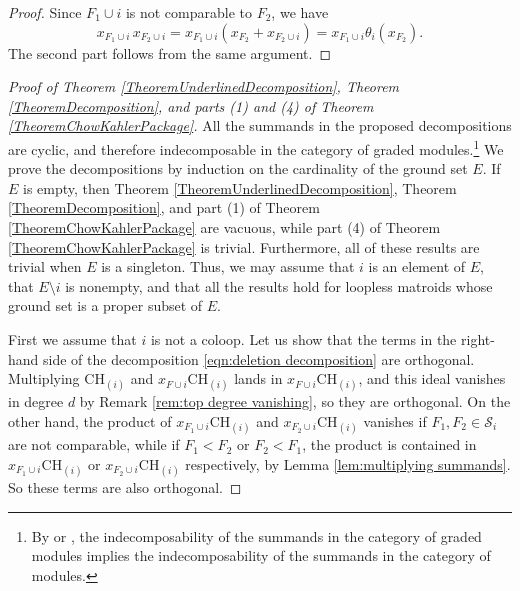 \documentclass[11pt,reqno]{amsart}
\theoremstyle{definition}
\newtheorem{lemma}[theorem]{Lemma}
\theoremstyle{remark}
\renewcommand{\(}{\left(}
\renewcommand{\)}{\right)}
\newcommand{\<}{\left<}
\renewcommand{\>}{\right>}
\begin{document}
\begin{proof}
Since $F_1\cup i$ is not comparable to $F_2$, we have
\[x_{F_1\cup i}\,x_{F_2\cup i} = x_{F_1\cup i}(x_{F_2}+x_{F_2\cup i}) = x_{F_1\cup i}\theta_i(x_{F_2}).\]
The second part follows from the same argument. 
\end{proof}




\begin{proof}[Proof of Theorem \ref{TheoremUnderlinedDecomposition}, Theorem \ref{TheoremDecomposition}, and 
parts (1) and (4) of Theorem \ref{TheoremChowKahlerPackage}]
All the summands in the proposed decompositions are cyclic, and therefore indecomposable in the category of graded  modules.\footnote{By \cite[Corollary 2]{CF} or \cite[Theorem 3.2]{GG},
the indecomposability of the summands in the category of graded modules implies the indecomposability of the summands in the category of  modules.}
We prove the decompositions by induction on the cardinality of the ground set $E$.
If $E$ is empty, then Theorem \ref{TheoremUnderlinedDecomposition}, Theorem \ref{TheoremDecomposition}, and part (1) of 
Theorem \ref{TheoremChowKahlerPackage}
are vacuous, while part (4) of Theorem \ref{TheoremChowKahlerPackage} is trivial.  Furthermore, all of these results are trivial when $E$
is a singleton.  Thus, we may assume
that $i$ is an element of $E$, that $E\setminus i$ is nonempty,
and that all the results hold for loopless matroids whose ground set is a proper subset of $E$.


First we assume that $i$ is not a coloop.  Let us show that the terms in the right-hand side of the decomposition \eqref{eqn:deletion decomposition} are orthogonal.  Multiplying $\mathrm{CH}_{(i)}$ and $x_{F\cup i}\mathrm{CH}_{(i)}$ lands in $x_{F\cup i}\mathrm{CH}_{(i)}$, and this ideal
vanishes in degree $d$ by Remark \ref{rem:top degree vanishing}, so they are orthogonal.  On the other hand, the product of $x_{F_1\cup i}\mathrm{CH}_{(i)}$ and 
$x_{F_2\cup i}\mathrm{CH}_{(i)}$ vanishes if $F_1, F_2\in \mathscr{S}_i$ are not comparable, while if $F_1 < F_2$ or $F_2 < F_1$, the product is contained in $x_{F_1\cup i}\mathrm{CH}_{(i)}$ or $x_{F_2\cup i}\mathrm{CH}_{(i)}$ respectively, by Lemma \ref{lem:multiplying summands}. So these terms are also orthogonal.


\end{proof}
\end{document}
